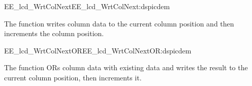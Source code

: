 \begin{function_nopb2}{EE\_lcd\_WrtColNext}{EE_lcd_WrtColNext:dspicdem}
  
  \begin{fundescription}
    The function writes column data to the current column position and
    then increments the column position.
  \end{fundescription}
  
  \begin{funparameters}
  \end{funparameters}
  
  
\end{function_nopb2}


\begin{function_nopb2}{EE\_lcd\_WrtColNextOR}{EE_lcd_WrtColNextOR:dspicdem}
  
  \begin{fundescription}
    The function ORs column data with existing data and writes the
    result to the current column position, then increments it.
  \end{fundescription}
  
  \begin{funparameters}
  \end{funparameters}
  
  
\end{function_nopb2}

